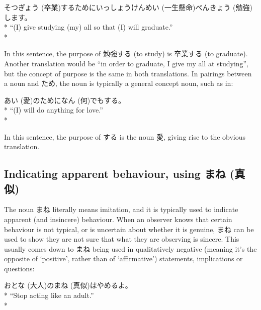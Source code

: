 \documentclass[11pt, b5paper, twoside, openright, onecolumn]{book}
\makeatletter
\newcommand*{\rubystack}[2]{{\relscale{0.5}%
  \begin{tabular}[b]{@{}c@{}}%
    {#1}\\%
   {\textscale{2}{#2}}%
  \end{tabular}}%
}
\DeclareRobustCommand*{\ruby}[2]{%
  \mbox{%
    \setlength{\parskip}{0ex}%
    \BeginAccSupp{method=pdfstringdef,ActualText={#1}}%
      \rubystack{\phantom{#2}}{#1}%
      \llap{%
        \rubystack{#2}{\phantom{#1}}%
      }%
    \EndAccSupp{}%
  }%
}
\renewcommand*{\ruby}[2]{#2 (#1)}%
\newenvironment{exampleblock}{
\setlength{\parindent}{0.6in}
\begin{minipage}[t]{\dimexpr\textwidth-\parindent}}
{\end{minipage}}
\makeatother
\begin{document}
\vspace{0.4cm}
\begin{exampleblock}
\ruby{卒業}{そつぎょう}するために\ruby{一生懸命}{いっしょうけんめい}\ruby{勉強}{べんきょう}します。 \\* 
“(I) give studying (my) all so that (I) will graduate.” \\* 
\end{exampleblock}
\vspace{0.2cm}

In this sentence‚ the purpose of 勉強する (to study) is 卒業する (to graduate). Another translation would be “in order to graduate‚ I give my all at studying”‚ but the concept of purpose is the same in both translations. In pairings between a noun and ため‚ the noun is typically a general concept noun‚ such as in:

\vspace{0.4cm}
\begin{exampleblock}
\ruby{愛}{あい}のために\ruby{何}{なん}でもする。 \\* 
“(I) will do anything for love.” \\* 
\end{exampleblock}
\vspace{0.2cm}

In this sentence‚ the purpose of する is the noun 愛‚ giving rise to the obvious translation.

\subsection{Indicating apparent behaviour‚ using \ruby{真似}{まね}}

The noun まね literally means imitation‚ and it is typically used to indicate apparent (and insincere) behaviour. When an observer knows that certain behaviour is not typical‚ or is uncertain about whether it is genuine‚ まね can be used to show they are not sure that what they are observing is sincere. This usually comes down to まね being used in qualitatively negative (meaning it’s the opposite of ‘positive’‚ rather than of ‘affirmative’) statements‚ implications or questions:

\vspace{0.4cm}
\begin{exampleblock}
\ruby{大人}{おとな}の\ruby{真似}{まね}はやめるよ。 \\* 
“Stop acting like an adult.” \\* 
\end{exampleblock}
\vspace{0.2cm}
\end{document}
